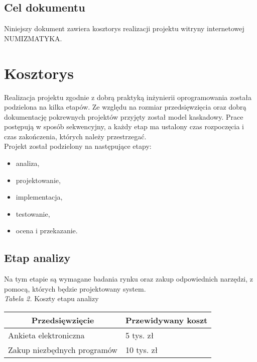 \documentclass [11pt, a4paper, leqno]	{article}	%
\begin{document}
\subsection{Cel dokumentu}
\noindent
Niniejszy dokument zawiera kosztorys realizacji projektu witryny internetowej NUMIZMATYKA. \\

\section{Kosztorys}
\noindent
Realizacja projektu zgodnie z dobrą praktyką inżynierii oprogramowania została podzielona na kilka etapów. Ze względu na rozmiar przedsięwzięcia oraz dobrą dokumentację pokrewnych projektów przyjęty został model kaskadowy. Prace postępują w sposób sekwencyjny, a każdy etap ma ustalony czas rozpoczęcia i czas zakończenia, których należy przestrzegać. \\

Projekt został podzielony na następujące etapy:
\begin{itemize}
\item analiza,
\item projektowanie,
\item implementacja,
\item testowanie,
\item ocena i przekazanie.
\end{itemize}


\subsection{Etap analizy}
\noindent
Na tym etapie są wymagane badania rynku oraz zakup odpowiednich narzędzi, z pomocą, których będzie projektowany system. \\ 

\textit{Tabela 2.} Koszty etapu analizy
\begin{center}
	\begin{tabular}{| l | l |}
		\hline
		\multicolumn{1}{|c|}{Przedsięwzięcie} & 
		\multicolumn{1}{|c|}{Przewidywany koszt} \\ \hline \hline
		Ankieta elektroniczna & 5 tys. zł \\ \hline
		Zakup niezbędnych programów & 10 tys. zł \\ \hline
	\end{tabular}
\end{center}
\end{document}
